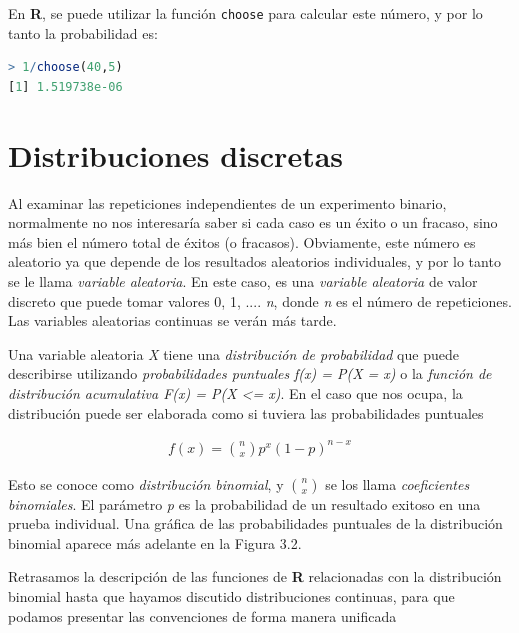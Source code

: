 En \textbf{R}, se puede utilizar la función \texttt{choose} para calcular este
número, y por lo tanto la probabilidad es:

\begin{lstlisting}[language=R]
> 1/choose(40,5)
[1] 1.519738e-06
\end{lstlisting}

\section{Distribuciones discretas}

Al examinar las repeticiones independientes de un experimento binario, normalmente
no nos interesaría saber si cada caso es un éxito o un fracaso, sino más bien el
número total de éxitos (o fracasos). Obviamente, este número es aleatorio ya que
depende de los resultados aleatorios individuales, y por lo tanto se le llama
\textit{variable aleatoria}. En este caso, es una \textit{variable
aleatoria} de valor discreto que puede tomar valores 0, 1, .... \textit{n},
donde \textit{n} es el número de repeticiones. Las variables aleatorias continuas se
verán más tarde.


Una variable aleatoria \textit{X} tiene una \textit{distribución de
probabilidad} que puede describirse utilizando \textit{probabilidades puntuales}
\textit{f(x) = P(X = x)}  o la \textit{función de distribución acumulativa F(x)
= P(X <= x)}. En el caso que nos ocupa, la distribución puede ser elaborada
como si tuviera las probabilidades puntuales

\begingroup
\Large
\begin{gather*}
    f(x) = \binom{n}{x} p^{x}(1-p)^{n-x}
\end{gather*}
\endgroup

Esto se conoce como \textit{distribución binomial}, y $\binom{n}{x}$ se los
llama \textit{coeficientes binomiales}. El parámetro \textit{p} es la
probabilidad de un resultado exitoso en una prueba individual. Una gráfica de
las probabilidades puntuales de la distribución binomial aparece más adelante en
la Figura 3.2.

Retrasamos la descripción de las funciones de \textbf{R} relacionadas con la
distribución binomial hasta que hayamos discutido distribuciones continuas, para
que podamos presentar las convenciones de forma manera unificada

